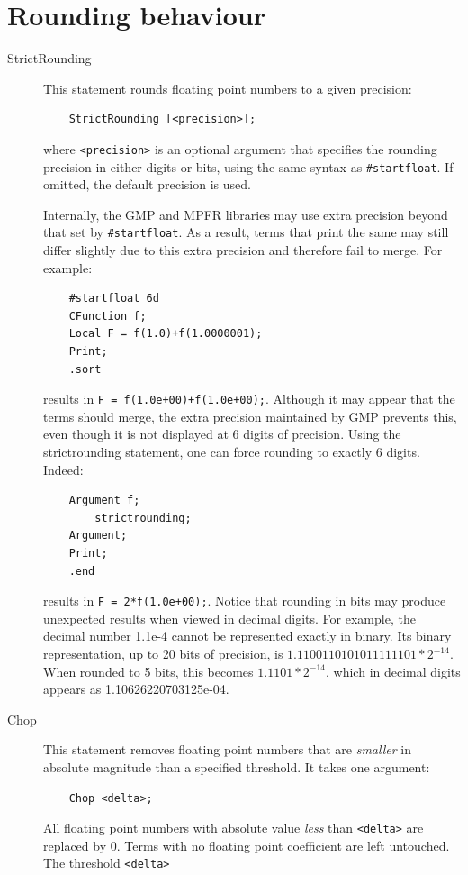 \section{Rounding behaviour}
\begin{description}
\item[StrictRounding] This statement rounds floating point numbers to a 
given precision:
\begin{verbatim}
	StrictRounding [<precision>];
\end{verbatim}
where \texttt{<precision>} is an optional argument that specifies the rounding 
precision in either digits or bits, using the same syntax as 
\texttt{\#startfloat}. If omitted, the default precision is used. 

Internally, the GMP and MPFR libraries may use extra precision beyond that set by 
\texttt{\#startfloat}. As a result, terms that print the same may still differ slightly 
due to this extra precision and therefore fail to merge. For example:
\begin{verbatim}
    #startfloat 6d
    CFunction f;
    Local F = f(1.0)+f(1.0000001);
    Print;
    .sort
\end{verbatim}
results in \texttt{F = f(1.0e+00)+f(1.0e+00);}. Although it may appear 
that the terms should merge, the extra precision maintained by GMP 
prevents this, even though it is not displayed at 6 digits of 
precision. Using the strictrounding statement, one can force rounding 
to exactly 6 digits. Indeed:
\begin{verbatim}
    Argument f;
        strictrounding;
    Argument;
    Print;
    .end
\end{verbatim}
results in \texttt{F = 2*f(1.0e+00);}.
Notice that rounding in bits may produce unexpected results when viewed 
in decimal digits. For example, the decimal number 1.1e-4 cannot be 
represented exactly in binary. Its binary representation, up to 20 bits of precision, is 
$1.1100110101011111101*2^{-14}$. When rounded to 5 bits, this becomes 
$1.1101*2^{-14}$, which in decimal digits appears as 
1.10626220703125e-04.
\item[Chop] This statement removes floating point numbers that are {\em smaller}
in absolute magnitude than a specified threshold. It takes one argument:
\begin{verbatim}
    Chop <delta>;
\end{verbatim}
All floating point numbers with absolute value {\em less} than \texttt{<delta>} are replaced by 0. 
Terms with no floating point coefficient are left untouched. The threshold \texttt{<delta>} 

\end{description}
